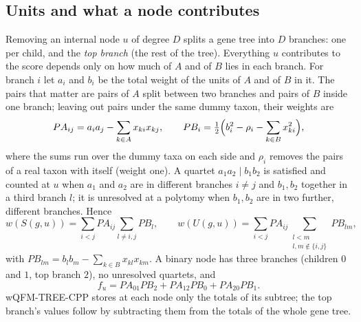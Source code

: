 \documentclass[11pt,a4paper]{article}
\newcommand{\cpp}{wQFM-TREE-CPP}
\begin{document}
\subsection{Units and what a node contributes}\label{sec:units}

Removing an internal node $u$ of degree $D$ splits a gene tree into $D$ branches: one per child, and
the \emph{top branch} (the rest of the tree). Everything $u$ contributes to the score depends only
on how much of $A$ and of $B$ lies in each branch. For branch $i$ let $a_i$ and $b_i$ be the total
weight of the units of $A$ and of $B$ in it. The pairs that matter are pairs of $A$ split between
two branches and pairs of $B$ inside one branch; leaving out pairs under the same dummy taxon,
their weights are
\begin{equation}\label{eq:pairs}
  PA_{ij} = a_i a_j - \sum_{k\in A} x_{ki}x_{kj}, \qquad
  PB_{i} = \tfrac12\Bigl(b_i^2 - \rho_i - \sum_{k\in B} x_{ki}^2\Bigr),
\end{equation}
where the sums run over the dummy taxa on each side and $\rho_i$ removes the pairs of a real taxon
with itself (weight one). A quartet $a_1a_2\mid b_1b_2$ is satisfied and counted at $u$ when $a_1$
and $a_2$ are in different branches $i\neq j$ and $b_1,b_2$ together in a third branch $l$; it is
unresolved at a polytomy when $b_1,b_2$ are in two further, different branches. Hence
\begin{equation}\label{eq:SU}
  w(S(g,u)) = \sum_{i<j} PA_{ij}\sum_{l\neq i,j} PB_l, \qquad
  w(U(g,u)) = \sum_{i<j} PA_{ij}\sum_{\substack{l<m\\ l,m\notin\{i,j\}}} PB_{lm},
\end{equation}
with $PB_{lm}=b_lb_m-\sum_{k\in B}x_{kl}x_{km}$. A binary node has three branches (children $0$ and
$1$, top branch $2$), no unresolved quartets, and
\begin{equation}\label{eq:binary}
  f_u = PA_{01}PB_2 + PA_{12}PB_0 + PA_{20}PB_1 .
\end{equation}
\cpp{} stores at each node only the totals of its subtree; the top branch's values follow by
subtracting them from the totals of the whole gene tree.
\end{document}
